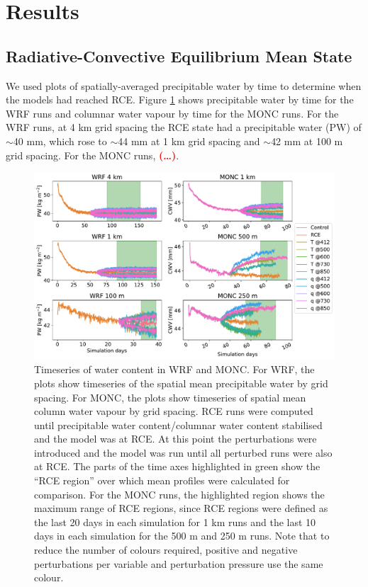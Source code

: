 \documentclass[draft]{agujournal2019}
\newcommand{\todo}[1]{\textcolor{red}{\textbf{(#1)}}}
\begin{document}
\section{Results}
\label{sec:results}

\subsection{Radiative-Convective Equilibrium Mean State}

We used plots of spatially-averaged precipitable water by time to determine when
the models had reached RCE. Figure \ref{fig:rce_pw} shows precipitable water by
time for the WRF runs and columnar water vapour by time for the MONC runs. For
the WRF runs, at 4 km grid spacing the RCE state had a precipitable water (PW)
of $\sim$40 mm, which rose to $\sim$44 mm at 1 km grid spacing and $\sim$42 mm
at 100 m grid spacing. For the MONC runs, \todo{\ldots}.

\begin{figure}[pth]
    \noindent\includegraphics[width=\textwidth]{figures/runs_timeseries.pdf}
    \caption{Timeseries of water content in WRF and MONC. For WRF, the plots
    show timeseries of the spatial mean precipitable water by grid spacing. For
    MONC, the plots show timeseries of spatial mean column water vapour by grid
    spacing. RCE runs were computed until precipitable water content/columnar
    water content stabilised and the model was at RCE. At this point the
    perturbations were introduced and the model was run until all perturbed runs
    were also at RCE. The parts of the time axes highlighted in green show the
    ``RCE region'' over which mean profiles were calculated for comparison. For
    the MONC runs, the highlighted region shows the maximum range of RCE
    regions, since RCE regions were defined as the last 20 days in each
    simulation for 1 km runs and the last 10 days in each simulation for the 500
    m and 250 m runs. Note that to reduce the number of colours required,
    positive and negative perturbations per variable and perturbation pressure
    use the same colour.}
    \label{fig:rce_pw}
\end{figure}
\end{document}
